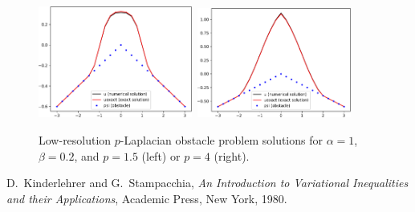 \documentclass[11pt]{amsart}
\begin{document}
\begin{figure}
\mbox{\includegraphics[width=0.45\textwidth]{solution1p5.pdf} \qquad \includegraphics[width=0.45\textwidth]{solution4.pdf}}
\caption{Low-resolution $p$-Laplacian obstacle problem solutions for $\alpha=1$, $\beta=0.2$, and $p=1.5$ (left) or $p=4$ (right).}
\label{fig:solutions}
\end{figure}



\begin{thebibliography}{1}

{\sc D.~Kinderlehrer and G.~Stampacchia}, {\em An {I}ntroduction to
  {V}ariational {I}nequalities and their {A}pplications}, Academic Press, New
  York, 1980.

\end{thebibliography}
\end{document}
